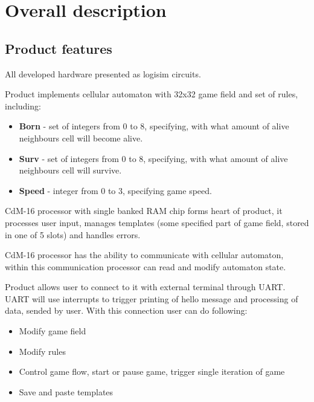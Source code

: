 \chapter*{Overall description}

\section*{Product features}

All developed hardware presented as logisim circuits.

Product implements cellular automaton with 32x32 game field and set of rules, including:

\begin{itemize}
	\item \textbf{Born} - set of integers from 0 to 8, specifying, with what amount of alive neighbours cell will become alive.
	\item \textbf{Surv} - set of integers from 0 to 8, specifying, with what amount of alive neighbours cell will survive.
	\item \textbf{Speed} - integer from 0 to 3, specifying game speed.
\end{itemize}

CdM-16 processor with single banked RAM chip forms heart of product, it processes user input, manages templates (some specified part of game field, stored in one of 5 slots) and handles errors.

CdM-16 processor has the ability to communicate with cellular automaton, within this communication processor can read and modify automaton state.

Product allows user to connect to it with external terminal through UART. UART will use interrupts to trigger printing of hello message and processing of data, sended by user. With this connection user can do following:

\begin{itemize}
	\item Modify game field
	\item Modify rules
	\item Control game flow, start or pause game, trigger single iteration of game
	\item Save and paste templates
\end{itemize}

